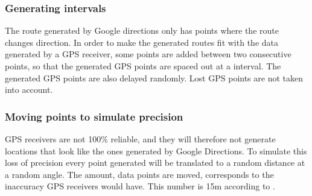 \subsubsection{Generating intervals}
The route generated by Google directions only has points where the route changes direction.
In order to make the generated routes fit with the data generated by a GPS receiver, some points are added between two consecutive points, so that the generated GPS points are spaced out at a interval.
The generated GPS points are also delayed randomly.
Lost GPS points are not taken into account.

\subsubsection{Moving points to simulate precision}
GPS receivers are not 100\% reliable, and they will therefore not generate locations that look like the ones generated by Google Directions.
To simulate this loss of precision every point generated will be translated to a random distance at a random angle.
The amount, data points are moved, corresponds to the inaccuracy GPS receivers would have. This number is 15m according to \citet{garmingps}.
